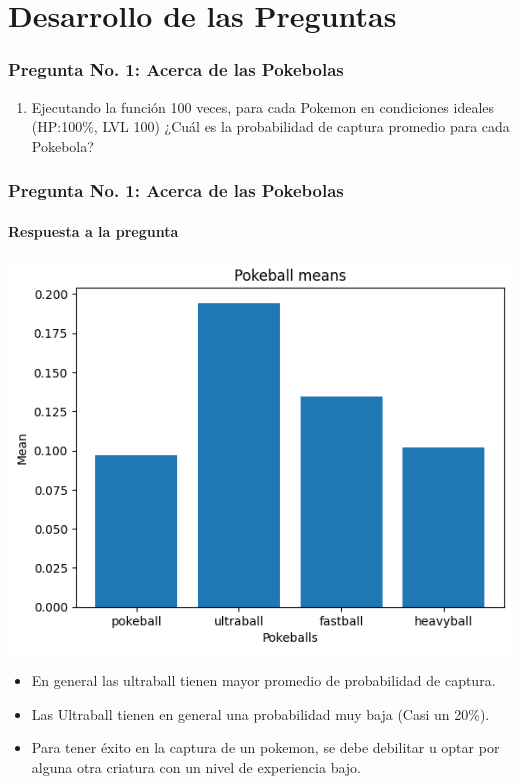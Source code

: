 \documentclass[aspectratio=169]{beamer}
\begin{document}
\section{Desarrollo de las Preguntas}
\begin{frame}
\frametitle{Pregunta No. 1: Acerca de las Pokebolas}
\begin{enumerate}[label=\emph{\alph*}), series=l_after]
\item Ejecutando la función 100 veces, para cada Pokemon en condiciones ideales (HP:100\%, LVL 100) ¿Cuál es la probabilidad de captura promedio para cada Pokebola?
\end{enumerate}
\end{frame}
\begin{frame}
\frametitle{Pregunta No. 1: Acerca de las Pokebolas}
\framesubtitle{Respuesta a la pregunta}
\begin{center}
\includegraphics[scale=.35]{Figures/output_1a.png}
\end{center}

\vspace{-.5cm}
\begin{itemize}
\item En general las ultraball tienen mayor promedio de probabilidad de captura.
\item Las Ultraball tienen en general una probabilidad muy baja (Casi un 20\%).
\item Para tener éxito en la captura de un pokemon, se debe debilitar u optar por alguna otra criatura con un nivel de experiencia bajo.
\end{itemize}
\end{frame}
\end{document}
